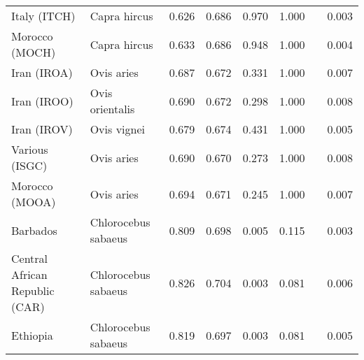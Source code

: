 \begin{center}
\begin{adjustbox}{width = 1\textwidth}
\begin{tabular}{|l|l|r|r|r|r|r|}
                   Italy (ITCH) &         Capra hircus &                                              0.626 &                                              0.686 &            0.970 &                         1.000~~ &              0.003 \\
                 Morocco (MOCH) &         Capra hircus &                                              0.633 &                                              0.686 &            0.948 &                         1.000~~ &              0.004 \\
                    Iran (IROA) &           Ovis aries &                                              0.687 &                                              0.672 &            0.331 &                         1.000~~ &              0.007 \\
                    Iran (IROO) &      Ovis orientalis &                                              0.690 &                                              0.672 &            0.298 &                         1.000~~ &              0.008 \\
                    Iran (IROV) &          Ovis vignei &                                              0.679 &                                              0.674 &            0.431 &                         1.000~~ &              0.005 \\
                 Various (ISGC) &           Ovis aries &                                              0.690 &                                              0.670 &            0.273 &                         1.000~~ &              0.008 \\
                 Morocco (MOOA) &           Ovis aries &                                              0.694 &                                              0.671 &            0.245 &                         1.000~~ &              0.007 \\
                       Barbados &  Chlorocebus sabaeus &                                              0.809 &                                              0.698 &            0.005 &                         0.115~~ &              0.003 \\
 Central African Republic (CAR) &  Chlorocebus sabaeus &                                              0.826 &                                              0.704 &            0.003 &                         0.081~~ &              0.006 \\
                       Ethiopia &  Chlorocebus sabaeus &                                              0.819 &                                              0.697 &            0.003 &                         0.081~~ &              0.005 \\

\end{tabular}
\end{adjustbox}
\end{center}
